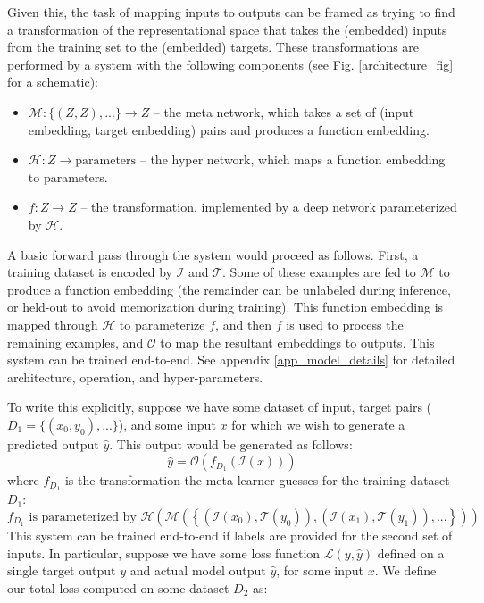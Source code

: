\documentclass{article}
\begin{document}
Given this, the task of mapping inputs to outputs can be framed as trying to find a transformation of the representational space that takes the (embedded) inputs from the training set to the (embedded) targets. These transformations are performed by a system with the following components (see Fig. \ref{architecture_fig} for a schematic):  
\vspace{-0.75em}
\begin{itemize} \setlength\itemsep{0em}
\item $\mathcal{M}: \{(Z, Z), ...\} \rightarrow Z $ -- the meta network, which takes a set of (input embedding, target embedding) pairs and produces a function embedding. 
\item $\mathcal{H}: Z \rightarrow \text{parameters}$ -- the hyper network, which maps a function embedding to parameters. 
\item $f: Z \rightarrow Z$ -- the transformation, implemented by a deep network parameterized by $\mathcal{H}$.
\end{itemize}
\vspace{-0.75em}
A basic forward pass through the system would proceed as follows. First, a training dataset is encoded by $\mathcal{I}$ and $\mathcal{T}$. Some of these examples are fed to $\mathcal{M}$ to produce a function embedding (the remainder can be unlabeled during inference, or held-out to avoid memorization during training). This function embedding is mapped through $\mathcal{H}$ to parameterize $f$, and then $f$ is used to process the remaining examples, and $\mathcal{O}$ to map the resultant embeddings to outputs. This system can be trained end-to-end. See appendix \ref{app_model_details} for detailed architecture, operation, and hyper-parameters. \par 
To write this explicitly, suppose we have some dataset of input, target pairs ($D_1 = \{(x_0, y_0), ...\}$), and some input $x$ for which we wish to generate a predicted output $\hat{y}$. This output would be generated as follows: 
\[\hat{y} = \mathcal{O}\left(f_{D_1}\left(\mathcal{I} \left(x\right)\right) \right)\]
where $f_{D_1}$ is the transformation the meta-learner guesses for the training dataset $D_1$:
\[f_{D_1} \text{ is parameterized by } \mathcal{H}\left(\mathcal{M}\left( \left\{\left(\mathcal{I}\left(x_0\right), \mathcal{T}\left(y_0\right) \right), \left(\mathcal{I}\left(x_1\right), \mathcal{T}\left(y_1\right) \right), ... \right\}\right)\right)\]
This system can be trained end-to-end if labels are provided for the second set of inputs. In particular, suppose we have some loss function $\mathcal{L}(y, \hat{y})$ defined on a single target output $y$ and actual model output $\hat{y}$, for some input $x$. We define our total loss computed on some dataset $D_2$ as:
\end{document}
